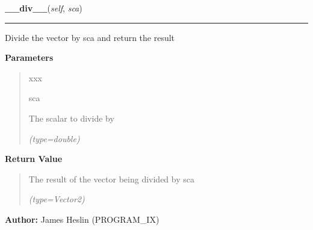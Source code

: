 \hspace{.8\funcindent}\begin{boxedminipage}{\funcwidth}

    \raggedright \textbf{\_\_div\_\_}(\textit{self}, \textit{sca})

    \vspace{-1.5ex}

    \rule{\textwidth}{0.5\fboxrule}
\setlength{\parskip}{2ex}
    Divide the vector by sca and return the result

\setlength{\parskip}{1ex}
      \textbf{Parameters}
      \vspace{-1ex}

      \begin{quote}
        \begin{Ventry}{xxx}

          \item[sca]

          The scalar to divide by

            {\it (type=double)}

        \end{Ventry}

      \end{quote}

      \textbf{Return Value}
    \vspace{-1ex}

      \begin{quote}
      The result of the vector being divided by sca

      {\it (type=Vector2)}

      \end{quote}

\textbf{Author:} James Heslin (PROGRAM\_IX)



    \end{boxedminipage}

